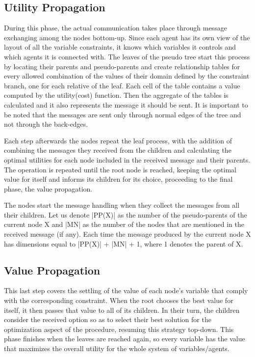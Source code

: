 \documentclass[11pt,a4paper,onecolumn]{article}
\begin{document}
	\subsection{Utility Propagation}
	During this phase, the actual communication takes place through message exchanging among the nodes bottom-up. Since each agent has its own view of the layout of all the variable constraints, it knows which variables it controls and which agents it is connected with. The leaves of the pseudo tree start this process by locating their parents and pseudo-parents and create relationship tables for every allowed combination of the values of their domain defined by the constraint branch, one for each relative of the leaf. Each cell of the table contains a value computed by the utility(cost) function. Then the aggregate of the tables is calculated and it also represents the message it should be sent. It is important to be noted that the messages are sent only through normal edges of the tree and not through the back-edges.
	
	Each step afterwards the nodes repeat the leaf process, with the addition of combining the messages they received from the children and calculating the optimal utilities for each node included in the received message and their parents. The operation is repeated until the root node is reached, keeping the optimal value for itself and informs its children for its choice, proceeding to the final phase, the value propagation.
	
	The nodes start the message handling when they collect the messages from all their children. Let us denote |PP(X)| as the number of the pseudo-parents of the current node X and |MN| as the number of the nodes that are mentioned in the received message (if any). Each time the message produced by the current node X has dimensions equal to |PP(X)| + |MN| + 1, where 1 denotes the parent of X.
	\subsection{Value Propagation}
	This last step covers the settling of the value of each node’s variable that comply with the corresponding constraint. When the root chooses the best value for itself, it then passes that value to all of its children. In their turn, the children consider the received option so as to select their best solution for the optimization aspect of the procedure, resuming this strategy top-down. This phase finishes when the leaves are reached again, so every variable has the value that maximizes the overall utility for the whole system of variables/agents.
	
\end{document}
